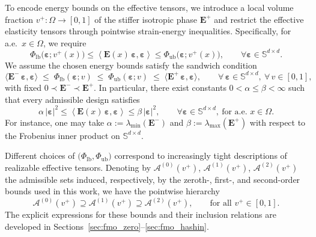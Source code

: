 \documentclass[preprint,3p]{elsarticle}
\newcommand{\tens}[1]{\bm{\mathit{#1}}}             %
\newcommand{\tenss}[1]{\bm{\mathbf{#1}}}            %
\newcommand{\tensf}[1]{\bm{\mathbf{#1}}}            %
\newcommand{\strain}{\tenss{\varepsilon}}           %
\newcommand{\Emin}{\tensf{E}^{-}}                   %
\newcommand{\Emax}{\tensf{E}^{+}}                   %
\begin{document}
To encode energy bounds on the effective tensors, we introduce a local volume fraction $v^+:\Omega\to[0,1]$ of the stiffer isotropic phase $\Emax$ and restrict the effective elasticity tensors through pointwise strain-energy inequalities. Specifically, for a.e.\ $\tens{x}\in\Omega$, we require
%
\begin{equation}\label{eq:strain_bounds_general}
\Phi_{\mathrm{lb}}\big(\strain; v^+(\tens{x})\big)
\le
\left\langle \tensf{E}(\tens{x})\,\strain,\strain\right\rangle
\le
\Phi_{\mathrm{ub}}\big(\strain; v^+(\tens{x})\big), \qquad \forall \strain\in \mathbb{S}^{d\times d}.
\end{equation}
%
We assume the chosen energy bounds satisfy the sandwich condition
%
\begin{equation}\label{eq:Phi_sandwich}
\langle \Emin\,\strain,\strain\rangle
\;\le\;
\Phi_{\mathrm{lb}}(\strain;v)
\;\le\;
\Phi_{\mathrm{ub}}(\strain;v)
\;\le\;
\langle \Emax\,\strain,\strain\rangle, \qquad
\forall\,\strain\in\mathbb{S}^{d\times d},\ \forall\,v\in[0,1],
\end{equation}
%
with fixed $0 \prec \Emin\prec \Emax$. In particular, there exist constants $0<\alpha\le\beta<\infty$ such that every admissible design satisfies 
%
\begin{equation}\label{eq:uniform_ellipticity_E}
\alpha\,\lvert\strain\rvert^2 \le \left\langle \tensf{E}(\tens{x})\,\strain,\strain\right\rangle \le \beta\,\lvert\strain\rvert^2,
\qquad \forall \strain\in\mathbb{S}^{d\times d},\ \text{for a.e. }\tens{x}\in\Omega.
\end{equation}
%
For instance, one may take $\alpha:=\lambda_{\min}(\Emin)$ and $\beta:=\lambda_{\max}(\Emax)$
with respect to the Frobenius inner product on $\mathbb{S}^{d\times d}$.

Different choices of $\big(\Phi_{\mathrm{lb}},\Phi_{\mathrm{ub}}\big)$ correspond to increasingly tight descriptions of realizable effective tensors. Denoting by $\mathcal{A}^{(0)}(v^+)$, $\mathcal{A}^{(1)}(v^+)$, $\mathcal{A}^{(2)}(v^+)$ the admissible sets induced, respectively, by the zeroth-, first-, and second-order bounds used in this work, we have the pointwise hierarchy
%
\begin{equation}\label{eq:hierarchy_bounds}
\mathcal{A}^{(0)}(v^+) \supseteq \mathcal{A}^{(1)}(v^+) \supseteq \mathcal{A}^{(2)}(v^+),
\qquad\text{for all }v^+\in[0,1].
\end{equation}
%
The explicit expressions for these bounds and their inclusion relations are developed in Sections~\ref{sec:fmo_zero}--\ref{sec:fmo_hashin}.
\end{document}
